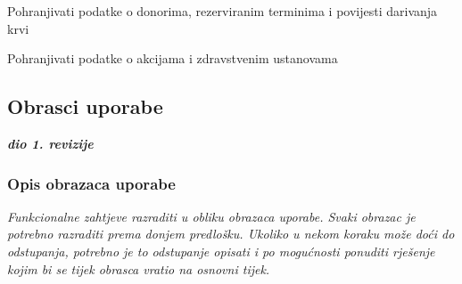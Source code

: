 \begin{packed_enum}
\begin{packed_enum}
				\end{packed_enum}

				\item  {}

				\begin{packed_enum}

					\item Pohranjivati podatke o donorima, rezerviranim terminima i povijesti darivanja krvi
					\item Pohranjivati podatke o akcijama i zdravstvenim ustanovama

				\end{packed_enum}

			\end{packed_enum}
			
			\eject 
			
			
				
			\subsection{Obrasci uporabe}
				
				\textbf{\textit{dio 1. revizije}}
				
				\subsubsection{Opis obrazaca uporabe}
					\textit{Funkcionalne zahtjeve razraditi u obliku obrazaca uporabe. Svaki obrazac je potrebno razraditi prema donjem predlošku. Ukoliko u nekom koraku može doći do odstupanja, potrebno je to odstupanje opisati i po mogućnosti ponuditi rješenje kojim bi se tijek obrasca vratio na osnovni tijek.}\\
					

